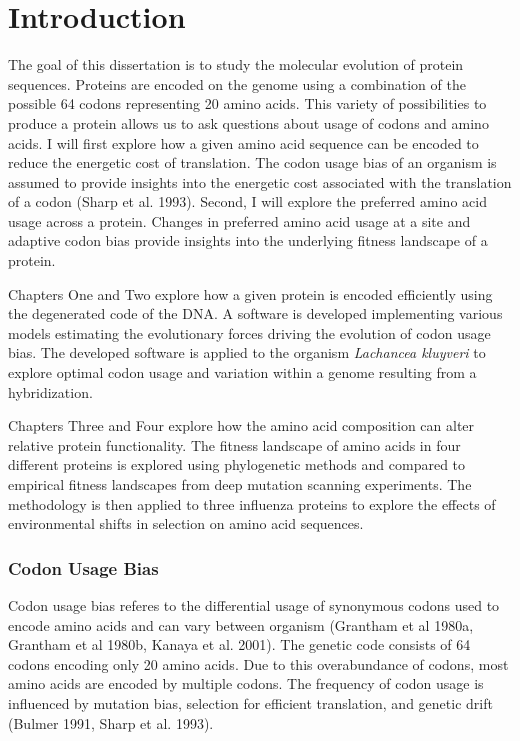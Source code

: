 \chapter{Introduction} \label{ch:introduction}

The goal of this dissertation is to study the molecular evolution of protein sequences.
Proteins are encoded on the genome using a combination of the possible 64 codons representing 20 amino acids. 
This variety of possibilities to produce a protein allows us to ask questions about usage of codons and amino acids.
I will first explore how a given amino acid sequence can be encoded to reduce the energetic cost of translation.
The codon usage bias of an organism is assumed to provide insights into the energetic cost associated with the translation of a codon (Sharp et al. 1993).
Second, I will explore the preferred amino acid usage across a protein.
Changes in preferred amino acid usage at a site and adaptive codon bias provide insights into the underlying fitness landscape of a protein.

Chapters One and Two explore how a given protein is encoded efficiently using the degenerated code of the DNA.
A software is developed implementing various models estimating the evolutionary forces driving the evolution of codon usage bias.
The developed software is applied to the organism \textit{Lachancea kluyveri} to explore optimal codon usage and variation within a genome resulting from a hybridization.

Chapters Three and Four explore how the amino acid composition can alter relative protein functionality.
The fitness landscape of amino acids in four different proteins is explored using phylogenetic methods and compared to empirical fitness landscapes from deep mutation scanning experiments.
The methodology is then applied to three influenza proteins to explore the effects of environmental shifts in selection on amino acid sequences. 

\subsection{Codon Usage Bias}
Codon usage bias referes to the differential usage of synonymous codons used to encode amino acids and can vary between organism (Grantham et al 1980a, Grantham et al 1980b, Kanaya et al. 2001). 
The genetic code consists of 64 codons encoding only 20 amino acids. 
Due to this overabundance of codons, most amino acids are encoded by multiple codons. 
The frequency of codon usage is influenced by mutation bias, selection for efficient translation, and genetic drift (Bulmer 1991, Sharp et al. 1993).

